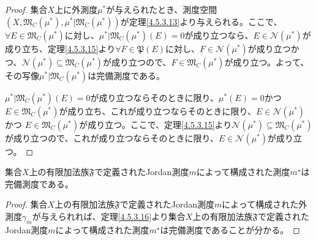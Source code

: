 \documentclass[dvipdfmx]{jsarticle}
\begin{document}
\begin{proof}集合$X$上に外測度$\mu^{*}$が与えられたとき、測度空間$\left( X,\mathfrak{M}_{C}\left( \mu^{*} \right),\mu^{*}|\mathfrak{M}_{C}\left( \mu^{*} \right) \right)$が定理\ref{4.5.3.13}より与えられる。ここで、$\forall E \in \mathfrak{M}_{C}\left( \mu^{*} \right)$に対し、$\mu^{*}|\mathfrak{M}_{C}\left( \mu^{*} \right)(E) = 0$が成り立つなら、$E \in \mathcal{N}\left( \mu^{*} \right)$が成り立ち、定理\ref{4.5.3.15}より$\forall F \in \mathfrak{P}(E)$に対し、$F \in \mathcal{N}\left( \mu^{*} \right)$が成り立つかつ、$\mathcal{N}\left( \mu^{*} \right) \subseteq \mathfrak{M}_{C}\left( \mu^{*} \right)$が成り立つので、$F \in \mathfrak{M}_{C}\left( \mu^{*} \right)$が成り立つ。よって、その写像$\mu^{*}|\mathfrak{M}_{C}\left( \mu^{*} \right)$は完備測度である。\par
$\mu^{*}|\mathfrak{M}_{C}\left( \mu^{*} \right)(E) = 0$が成り立つならそのときに限り、$\mu^{*}(E) = 0$かつ$E \in \mathfrak{M}_{C}\left( \mu^{*} \right)$が成り立ち、これが成り立つならそのときに限り、$E \in \mathcal{N}\left( \mu^{*} \right)$かつ
$E \in \mathfrak{M}_{C}\left( \mu^{*} \right)$が成り立つ。ここで、定理\ref{4.5.3.15}より$\mathcal{N}\left( \mu^{*} \right) \subseteq \mathfrak{M}_{C}\left( \mu^{*} \right)$が成り立つので、これが成り立つならそのときに限り、$E \in \mathcal{N}\left( \mu^{*} \right)$が成り立つ。
\end{proof}
\begin{thm}\label{4.5.3.17}
集合$X$上の有限加法族$\mathfrak{F}$で定義されたJordan測度$m$によって構成された測度$m^{\star}$は完備測度である。
\end{thm}
\begin{proof}
集合$X$上の有限加法族$\mathfrak{F}$で定義されたJordan測度$m$によって構成された外測度$\gamma_{m}$が与えられれば、定理\ref{4.5.3.16}より集合$X$上の有限加法族$\mathfrak{F}$で定義されたJordan測度$m$によって構成された測度$m^{\star}$は完備測度であることが分かる。
\end{proof}
\end{document}
